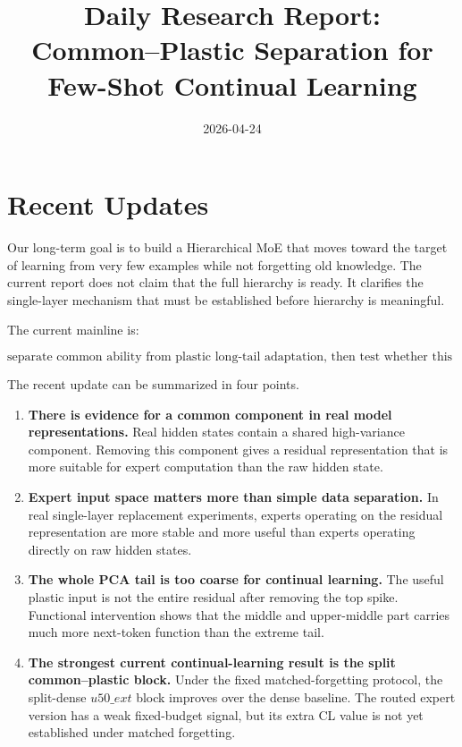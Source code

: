 \documentclass[11pt]{article}
\title{Daily Research Report:\\Common--Plastic Separation for Few-Shot Continual Learning}
\author{}
\date{2026-04-24}
\begin{document}
\maketitle

\section{Recent Updates}

Our long-term goal is to build a Hierarchical MoE that moves toward the target of learning from very few examples while not forgetting old knowledge. The current report does not claim that the full hierarchy is ready. It clarifies the single-layer mechanism that must be established before hierarchy is meaningful.

The current mainline is:

$$
\text{separate common ability from plastic long-tail adaptation, then test whether this reduces forgetting.}
$$

The recent update can be summarized in four points.

\begin{enumerate}[leftmargin=1.5em]
    \item \textbf{There is evidence for a common component in real model representations.}
    Real hidden states contain a shared high-variance component. Removing this component gives a residual representation that is more suitable for expert computation than the raw hidden state.

    \item \textbf{Expert input space matters more than simple data separation.}
    In real single-layer replacement experiments, experts operating on the residual representation are more stable and more useful than experts operating directly on raw hidden states.

    \item \textbf{The whole PCA tail is too coarse for continual learning.}
    The useful plastic input is not the entire residual after removing the top spike. Functional intervention shows that the middle and upper-middle part carries much more next-token function than the extreme tail.

    \item \textbf{The strongest current continual-learning result is the split common--plastic block.}
    Under the fixed matched-forgetting protocol, the split-dense $u50\_ext$ block improves over the dense baseline. The routed expert version has a weak fixed-budget signal, but its extra CL value is not yet established under matched forgetting.
\end{enumerate}
\end{document}
